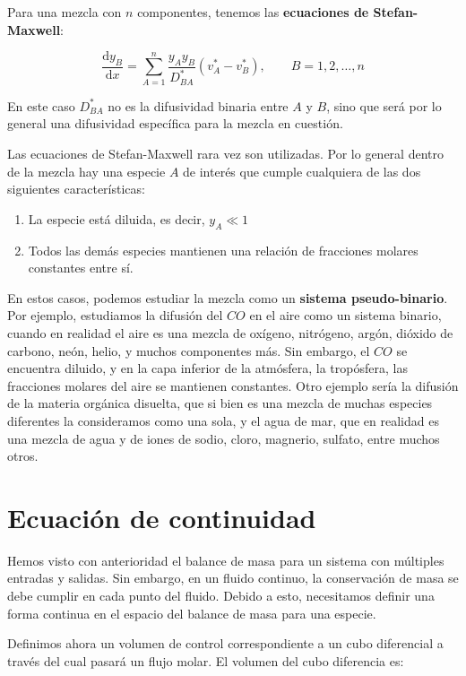 \documentclass[11pt]{article}
\begin{document}
Para una mezcla con \( n \) componentes, tenemos las \textbf{ecuaciones de Stefan-Maxwell}:

\[ \boxed{ \frac{ \mathrm d y_B }{ \mathrm d x } = \displaystyle \sum_{ A = 1 }^{n} \frac{ y_A y_B }{ D_{BA}^{*} } \left( v_{A}^{*} - v_{B}^{*} \right) , \qquad B = 1, 2, \dots , n } \]

En este caso \( D_{BA}^{*} \) no es la difusividad binaria entre \( A \) y \( B \), sino que será por lo general una difusividad específica para la mezcla en cuestión.

Las ecuaciones de Stefan-Maxwell rara vez son utilizadas. Por lo general dentro de la mezcla hay una especie \( A \) de interés que cumple cualquiera de las dos siguientes características:

\begin{enumerate}
    \item La especie está diluida, es decir, \( y_A \ll 1 \)
    \item Todos las demás especies mantienen una relación de fracciones molares constantes entre sí.
\end{enumerate}

En estos casos, podemos estudiar la mezcla como un \textbf{sistema pseudo-binario}. Por ejemplo, estudiamos la difusión del \( CO \) en el aire como un sistema binario, cuando en realidad el aire es una mezcla de oxígeno, nitrógeno, argón, dióxido de carbono, neón, helio, y muchos componentes más. Sin embargo, el \( CO \) se encuentra diluido, y en la capa inferior de la atmósfera, la tropósfera, las fracciones molares del aire se mantienen constantes. Otro ejemplo sería la difusión de la materia orgánica disuelta, que si bien es una mezcla de muchas especies diferentes la consideramos como una sola, y el agua de mar, que en realidad es una mezcla de agua y de iones de sodio, cloro, magnerio, sulfato, entre muchos otros.

\section{Ecuación de continuidad}

Hemos visto con anterioridad el balance de masa para un sistema con múltiples entradas y salidas. Sin embargo, en un fluido continuo, la conservación de masa se debe cumplir en cada punto del fluido. Debido a esto, necesitamos definir una forma continua en el espacio del balance de masa para una especie.

Definimos ahora un volumen de control correspondiente a un cubo diferencial a través del cual pasará un flujo molar. El volumen del cubo diferencia es:
\end{document}
